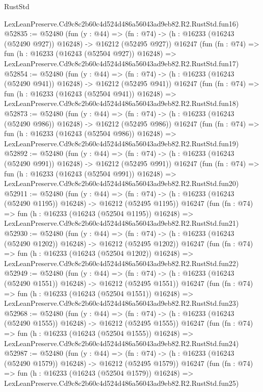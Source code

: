 \begin{lexlean}{RustStd}
\begin{coremodule}
    LexLeanPreserve.Cd9c8c2b60c4d524d486a56043ad9eb82.R2.RustStd.fun16)
@52835 := @52480
    (fun (y : @44) =>
    (fn : @74) -> (h : @16233 (@16243 (@52490 @927)) @16248) -> @16212 (@52495 @927))
    @16247
    (fun (fn : @74) =>
    fun (h : @16233 (@16243 (@52504 @927)) @16248) =>
    LexLeanPreserve.Cd9c8c2b60c4d524d486a56043ad9eb82.R2.RustStd.fun17)
@52854 := @52480
    (fun (y : @44) =>
    (fn : @74) -> (h : @16233 (@16243 (@52490 @941)) @16248) -> @16212 (@52495 @941))
    @16247
    (fun (fn : @74) =>
    fun (h : @16233 (@16243 (@52504 @941)) @16248) =>
    LexLeanPreserve.Cd9c8c2b60c4d524d486a56043ad9eb82.R2.RustStd.fun18)
@52873 := @52480
    (fun (y : @44) =>
    (fn : @74) -> (h : @16233 (@16243 (@52490 @986)) @16248) -> @16212 (@52495 @986))
    @16247
    (fun (fn : @74) =>
    fun (h : @16233 (@16243 (@52504 @986)) @16248) =>
    LexLeanPreserve.Cd9c8c2b60c4d524d486a56043ad9eb82.R2.RustStd.fun19)
@52892 := @52480
    (fun (y : @44) =>
    (fn : @74) -> (h : @16233 (@16243 (@52490 @991)) @16248) -> @16212 (@52495 @991))
    @16247
    (fun (fn : @74) =>
    fun (h : @16233 (@16243 (@52504 @991)) @16248) =>
    LexLeanPreserve.Cd9c8c2b60c4d524d486a56043ad9eb82.R2.RustStd.fun20)
@52911 := @52480
    (fun (y : @44) =>
    (fn : @74) -> (h : @16233 (@16243 (@52490 @1195)) @16248) -> @16212 (@52495 @1195))
    @16247
    (fun (fn : @74) =>
    fun (h : @16233 (@16243 (@52504 @1195)) @16248) =>
    LexLeanPreserve.Cd9c8c2b60c4d524d486a56043ad9eb82.R2.RustStd.fun21)
@52930 := @52480
    (fun (y : @44) =>
    (fn : @74) -> (h : @16233 (@16243 (@52490 @1202)) @16248) -> @16212 (@52495 @1202))
    @16247
    (fun (fn : @74) =>
    fun (h : @16233 (@16243 (@52504 @1202)) @16248) =>
    LexLeanPreserve.Cd9c8c2b60c4d524d486a56043ad9eb82.R2.RustStd.fun22)
@52949 := @52480
    (fun (y : @44) =>
    (fn : @74) -> (h : @16233 (@16243 (@52490 @1551)) @16248) -> @16212 (@52495 @1551))
    @16247
    (fun (fn : @74) =>
    fun (h : @16233 (@16243 (@52504 @1551)) @16248) =>
    LexLeanPreserve.Cd9c8c2b60c4d524d486a56043ad9eb82.R2.RustStd.fun23)
@52968 := @52480
    (fun (y : @44) =>
    (fn : @74) -> (h : @16233 (@16243 (@52490 @1555)) @16248) -> @16212 (@52495 @1555))
    @16247
    (fun (fn : @74) =>
    fun (h : @16233 (@16243 (@52504 @1555)) @16248) =>
    LexLeanPreserve.Cd9c8c2b60c4d524d486a56043ad9eb82.R2.RustStd.fun24)
@52987 := @52480
    (fun (y : @44) =>
    (fn : @74) -> (h : @16233 (@16243 (@52490 @1579)) @16248) -> @16212 (@52495 @1579))
    @16247
    (fun (fn : @74) =>
    fun (h : @16233 (@16243 (@52504 @1579)) @16248) =>
    LexLeanPreserve.Cd9c8c2b60c4d524d486a56043ad9eb82.R2.RustStd.fun25)

\end{coremodule}
\end{lexlean}
